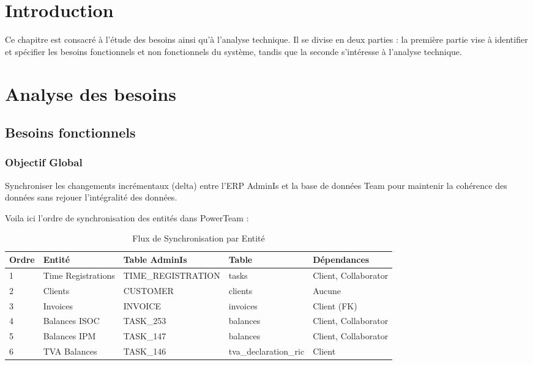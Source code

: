 \section{Introduction}

Ce chapitre est consacré à l'étude des besoins ainsi qu'à l'analyse technique. Il se divise en deux parties : la première partie vise à identifier et spécifier les besoins fonctionnels et non fonctionnels du système, tandis que la seconde s'intéresse à l'analyse technique.

\section{Analyse des besoins}

\subsection{Besoins fonctionnels}

\subsubsection{Objectif Global}

Synchroniser les changements incrémentaux (delta) entre l'ERP AdminIs et la base de données Team pour maintenir la cohérence des données sans rejouer l'intégralité des données.

Voila ici l'ordre de synchronisation des entités dans PowerTeam :

\begin{table}[H]
\centering
\begin{tabular}{|l|l|l|l|l|}
\hline
\textbf{Ordre} & \textbf{Entité} & \textbf{Table AdminIs} & \textbf{Table} & \textbf{Dépendances} \\
\hline
1 & Time Registrations & TIME_REGISTRATION & tasks & Client, Collaborator \\
\hline
2 & Clients & CUSTOMER & clients & Aucune \\
\hline
3 & Invoices & INVOICE & invoices & Client (FK) \\
\hline
4 & Balances ISOC & TASK_253 & balances & Client, Collaborator \\
\hline
5 & Balances IPM & TASK_147 & balances & Client, Collaborator \\
\hline
6 & TVA Balances & TASK_146 & tva_declaration_ric & Client \\
\hline
\end{tabular}
\caption{Flux de Synchronisation par Entité}
\end{table}

